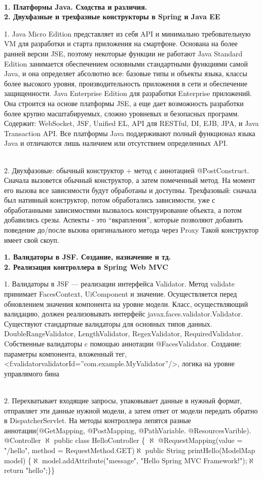 \documentclass{article}
\newcommand{\bil}[4]{%
    \begin{minipage}{.3\textwidth}
        \textbf{1. #1} \\
        \textbf{2. #2}

        1. #3
        \\
        2. #4
    \end{minipage}
}
\begin{document}
\\
\bil{Платформы Java. Сходства и различия.}{Двухфазные и трехфазные конструкторы в Spring и Java EE}{
Java Micro Edition представляет из себя API и минимально требовательную VM для разработки и старта приложения на смартфоне. Основана на более ранней версии JSE, поэтому некоторые функции не работают
Java Standard Edition занимается обеспечением основными стандартными функциями самой Java, и она определяет абсолютно все: базовые типы и объекты языка, классы более высокого уровня, производительность приложения в сети и обеспечение защищенности.
Java Enterprise Edition для разработки Enterprise приложений. Она строится на основе платформы JSE, а еще дает возможность разработки более крупно масштабируемых, сложно уровневых и безопасных программ. Содержит: WebSocket, JSF, Unified EL, API для RESTful, DI, EJB, JPA, и Java Transaction API.
Все платформы Java поддерживают полный функционал языка Java и отличаются лишь наличием или отсутствием определенных API.
}{
    Двухфазовые: обычный конструктор + метод с аннотацией @PostConstruct. 
    Сначала вызовется обычный конструктор, а затем помеченный метод. 
    На момент его вызова все зависимости будут обработаны и доступны.
    Трехфазовый: сначала был нативный конструктор, потом обработались зависимости, уже с обработанными зависимостями вызвалось конструирование объекта, а потом добавились срезы. 
Аспекты - это “вкрапления”, которые позволяют добавить поведение до/после вызова оригинального метода через Proxy
Такой конструктор имеет свой скоуп.
}
\hfill
\bil{Валидаторы в JSF. Создание, назначение и тд.}{Реализация контроллера в Spring Web MVC}{
    Валидаторы в JSF — реализации интерфейса Validator. Метод validate принимает FacesContext, UiComponent и значение.
    Осуществляется перед обновлением значения компонента на уровне модели. Класс, осуществляющий валидацию, должен реализовывать 
    интерфейс javax.faces.validator.Validator. Существуют стандартные валидаторы для основных типов данных.  
    DoubleRangeValidator, LengthValidator, RegexValidator, RequiredValidator. Cобственные валидаторы c помощью аннотации @FacesValidator.
    Создание: параметры компонента, вложенный тег, <f:validatorvalidatorId=”com.example.MyValidator”/>, логика на уровне управлямого бина
}{
    Перехватывает входящие запросы, упаковывает данные в нужный формат, отправляет эти данные нужной модели, а затем ответ от модели передать обратно в DispatcherServlet. 
    На методы контроллера лепятся разные аннотации(@GetMapping, @PostMapping, @PathVariable. @ResourcesVarible).
    @Controller $\aleph$ public class HelloController \{ $\aleph$ @RequestMapping(value = "/hello", method = RequestMethod.GET)$\aleph$ 
    public String printHello(ModelMap  model) \{$\aleph$ 
    model.addAttribute("message", "Hello Spring MVC Framework!");$\aleph$
    return "hello";\}\}
}
\end{document}
